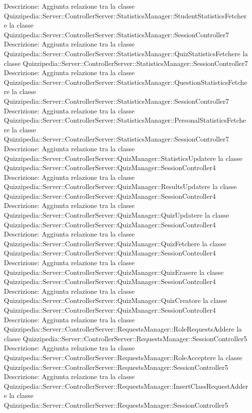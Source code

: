 Descrizione: Aggiunta relazione tra la classe Quizzipedia::Server::ControllerServer::StatisticsManager::StudentStatisticsFetchere la classe Quizzipedia::Server::ControllerServer::StatisticsManager::SessionController7 
Descrizione: Aggiunta relazione tra la classe Quizzipedia::Server::ControllerServer::StatisticsManager::QuizStatisticsFetchere la classe Quizzipedia::Server::ControllerServer::StatisticsManager::SessionController7 
Descrizione: Aggiunta relazione tra la classe Quizzipedia::Server::ControllerServer::StatisticsManager::QuestionStatisticsFetchere la classe Quizzipedia::Server::ControllerServer::StatisticsManager::SessionController7 
Descrizione: Aggiunta relazione tra la classe Quizzipedia::Server::ControllerServer::StatisticsManager::PersonalStatisticsFetchere la classe Quizzipedia::Server::ControllerServer::StatisticsManager::SessionController7 
Descrizione: Aggiunta relazione tra la classe Quizzipedia::Server::ControllerServer::QuizManager::StatisticsUpdatere la classe Quizzipedia::Server::ControllerServer::QuizManager::SessionController4 
Descrizione: Aggiunta relazione tra la classe Quizzipedia::Server::ControllerServer::QuizManager::ResultsUpdatere la classe Quizzipedia::Server::ControllerServer::QuizManager::SessionController4 
Descrizione: Aggiunta relazione tra la classe Quizzipedia::Server::ControllerServer::QuizManager::QuizUpdatere la classe Quizzipedia::Server::ControllerServer::QuizManager::SessionController4 
Descrizione: Aggiunta relazione tra la classe Quizzipedia::Server::ControllerServer::QuizManager::QuizFetchere la classe Quizzipedia::Server::ControllerServer::QuizManager::SessionController4 
Descrizione: Aggiunta relazione tra la classe Quizzipedia::Server::ControllerServer::QuizManager::QuizErasere la classe Quizzipedia::Server::ControllerServer::QuizManager::SessionController4 
Descrizione: Aggiunta relazione tra la classe Quizzipedia::Server::ControllerServer::QuizManager::QuizCreatore la classe Quizzipedia::Server::ControllerServer::QuizManager::SessionController4 
Descrizione: Aggiunta relazione tra la classe Quizzipedia::Server::ControllerServer::RequestsManager::RoleRequestsAddere la classe Quizzipedia::Server::ControllerServer::RequestsManager::SessionController5 
Descrizione: Aggiunta relazione tra la classe Quizzipedia::Server::ControllerServer::RequestsManager::RoleAcceptere la classe Quizzipedia::Server::ControllerServer::RequestsManager::SessionController5 
Descrizione: Aggiunta relazione tra la classe Quizzipedia::Server::ControllerServer::RequestsManager::InsertClassRequestAddere la classe Quizzipedia::Server::ControllerServer::RequestsManager::SessionController5 
